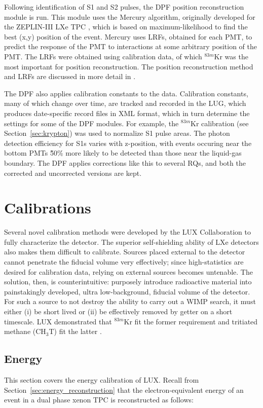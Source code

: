 Following identification of S1 and S2 pulses, the \ac{DPF} position reconstruction module is run. This module uses the Mercury algorithm, originally developed for the ZEPLIN-III \ac{LXe} \ac{TPC} \cite{Currie2012}, which is based on maximum-likelihood to find the best (x,y) position of the event. Mercury uses \ac{LRF}s, obtained for each \ac{PMT}, to predict the response of the \ac{PMT} to interactions at some arbitrary position of the \ac{PMT}. The \ac{LRF}s were obtained using calibration data, of which $^{83m}$Kr was the most important for position reconstruction. The position reconstruction method and \ac{LRF}s are discussed in more detail in \cite{LUXPositionReconstruction}.


The \ac{DPF} also applies calibration constants to the data. Calibration constants, many of which change over time, are tracked and recorded in the \ac{LUG}, which produces date-specific record files in XML format, which in turn determine the settings for some of the \ac{DPF} modules. For example, the $^{83m}$Kr calibration (see Section~\ref{sec:krypton}) was used to normalize S1 pulse areas. The photon detection efficiency for S1s varies with z-position, with events occuring near the bottom \ac{PMT}s \~50\% more likely to be detected than those near the liquid-gas boundary. The \ac{DPF} applies corrections like this to several RQs, and both the corrected and uncorrected versions are kept. 


\section{Calibrations}
Several novel calibration methods were developed by the \ac{LUX} Collaboration to fully characterize the detector. The superior self-shielding ability of \ac{LXe} detectors also makes them difficult to calibrate. Sources placed external to the detector cannot penetrate the fiducial volume very effectively; since high-statistics are desired for calibration data, relying on external sources becomes untenable. The solution, then, is counterintuitive: purposely introduce radioactive material into painstakingly developed, ultra low-background, fiducial volume of the detector. For such a source to not destroy the ability to carry out a \ac{WIMP} search, it must either (i) be short lived or (ii) be effectively removed by getter on a short timescale. \ac{LUX} demonstrated that $^{83m}$Kr fit the former \cite{LUXKr} requirement and tritiated methane (CH$_{3}$T) fit the latter \cite{LUXTritium}.

\subsection{Energy}
This section covers the energy calibration of \ac{LUX}. Recall from Section~\ref{sec:energy_reconstruction} that the electron-equivalent energy of an event in a dual phase xenon \ac{TPC} is reconstructed as follows:

